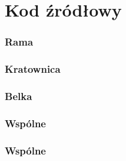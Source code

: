 \chapter{Kod źródłowy}
\subsection*{Rama}

\newpage

\subsection*{Kratownica}

\newpage

\subsection*{Belka}

\newpage

\subsection*{Wspólne}

\newpage

\subsection*{Wspólne}
